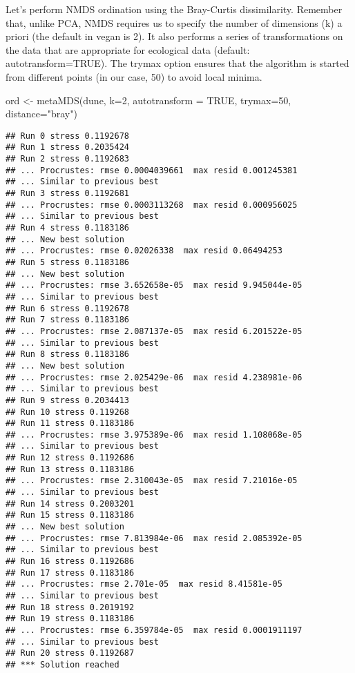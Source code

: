\documentclass[
]{book}
\newenvironment{Shaded}{\begin{snugshade}}{\end{snugshade}}
\newcommand{\AttributeTok}[1]{\textcolor[rgb]{0.77,0.63,0.00}{#1}}
\newcommand{\ConstantTok}[1]{\textcolor[rgb]{0.00,0.00,0.00}{#1}}
\newcommand{\DecValTok}[1]{\textcolor[rgb]{0.00,0.00,0.81}{#1}}
\newcommand{\FunctionTok}[1]{\textcolor[rgb]{0.00,0.00,0.00}{#1}}
\newcommand{\NormalTok}[1]{#1}
\newcommand{\OtherTok}[1]{\textcolor[rgb]{0.56,0.35,0.01}{#1}}
\newcommand{\StringTok}[1]{\textcolor[rgb]{0.31,0.60,0.02}{#1}}
\begin{document}
Let's perform NMDS ordination using the Bray-Curtis dissimilarity. Remember that, unlike PCA, NMDS requires us to specify the number of dimensions (k) a priori (the default in vegan is 2). It also performs a series of transformations on the data that are appropriate for ecological data (default: autotransform=TRUE). The trymax option ensures that the algorithm is started from different points (in our case, 50) to avoid local minima.

\begin{Shaded}
\begin{Highlighting}[]
\NormalTok{ord }\OtherTok{\textless{}{-}} \FunctionTok{metaMDS}\NormalTok{(dune, }\AttributeTok{k=}\DecValTok{2}\NormalTok{, }\AttributeTok{autotransform =} \ConstantTok{TRUE}\NormalTok{, }\AttributeTok{trymax=}\DecValTok{50}\NormalTok{, }\AttributeTok{distance=}\StringTok{"bray"}\NormalTok{)}
\end{Highlighting}
\end{Shaded}

\begin{verbatim}
## Run 0 stress 0.1192678 
## Run 1 stress 0.2035424 
## Run 2 stress 0.1192683 
## ... Procrustes: rmse 0.0004039661  max resid 0.001245381 
## ... Similar to previous best
## Run 3 stress 0.1192681 
## ... Procrustes: rmse 0.0003113268  max resid 0.000956025 
## ... Similar to previous best
## Run 4 stress 0.1183186 
## ... New best solution
## ... Procrustes: rmse 0.02026338  max resid 0.06494253 
## Run 5 stress 0.1183186 
## ... New best solution
## ... Procrustes: rmse 3.652658e-05  max resid 9.945044e-05 
## ... Similar to previous best
## Run 6 stress 0.1192678 
## Run 7 stress 0.1183186 
## ... Procrustes: rmse 2.087137e-05  max resid 6.201522e-05 
## ... Similar to previous best
## Run 8 stress 0.1183186 
## ... New best solution
## ... Procrustes: rmse 2.025429e-06  max resid 4.238981e-06 
## ... Similar to previous best
## Run 9 stress 0.2034413 
## Run 10 stress 0.119268 
## Run 11 stress 0.1183186 
## ... Procrustes: rmse 3.975389e-06  max resid 1.108068e-05 
## ... Similar to previous best
## Run 12 stress 0.1192686 
## Run 13 stress 0.1183186 
## ... Procrustes: rmse 2.310043e-05  max resid 7.21016e-05 
## ... Similar to previous best
## Run 14 stress 0.2003201 
## Run 15 stress 0.1183186 
## ... New best solution
## ... Procrustes: rmse 7.813984e-06  max resid 2.085392e-05 
## ... Similar to previous best
## Run 16 stress 0.1192686 
## Run 17 stress 0.1183186 
## ... Procrustes: rmse 2.701e-05  max resid 8.41581e-05 
## ... Similar to previous best
## Run 18 stress 0.2019192 
## Run 19 stress 0.1183186 
## ... Procrustes: rmse 6.359784e-05  max resid 0.0001911197 
## ... Similar to previous best
## Run 20 stress 0.1192687 
## *** Solution reached
\end{verbatim}
\end{document}
